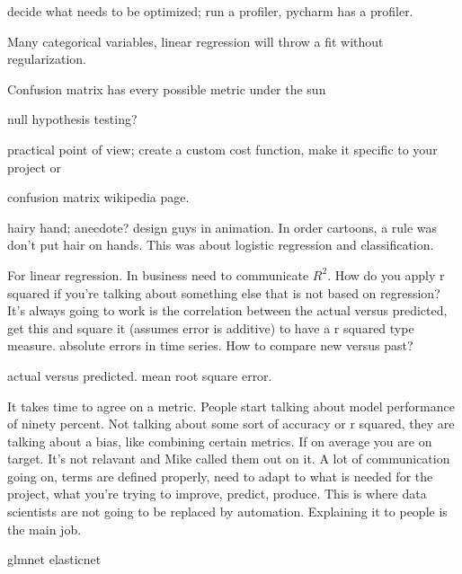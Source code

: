 decide what needs to be optimized;
run a profiler, pycharm has a profiler.

Many categorical variables, linear regression
will throw a fit without regularization.

Confusion matrix has every possible metric under the sun

null hypothesis testing?

practical point of view; create
a custom cost function, make it specific
to your project or

confusion matrix wikipedia page.

hairy hand; anecdote? design
guys in animation. In order cartoons,
a rule was don't put hair on hands.
This was about logistic regression and
classification.

For linear regression.
In business need to communicate $R^2$.
How do you apply r squared if you're talking about something else that is not
based on regression? It's always
going to work is the correlation between
the actual versus predicted, get this and
square it (assumes error is additive) to have a r squared type measure. absolute errors in time series. How to compare new versus past?

actual versus predicted.  mean root square error.

It takes time to agree on a metric. People start talking about model
performance of ninety percent. Not talking about some sort of accuracy or r squared, they are talking about a bias, like combining certain metrics. If on average you are on target. It's not relavant and Mike called them out on it. A lot of communication going on, terms are defined properly, need to adapt to what is needed for
the project, what you're trying to improve, predict, 
produce. This is where data scientists are not going to
be replaced by automation. Explaining it to people is
the main job. 

glmnet
elasticnet